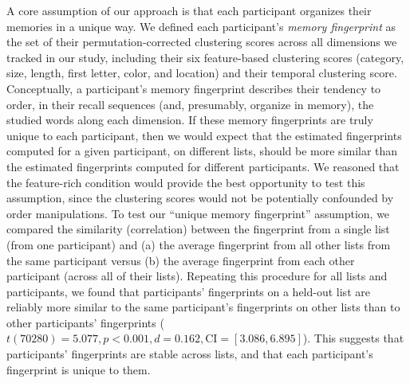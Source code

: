 \documentclass[11pt]{article}
\begin{document}
A core assumption of our approach is that each participant organizes their
memories in a unique way. We defined each participant's \textit{memory
fingerprint} as the set of their permutation-corrected clustering scores across
all dimensions we tracked in our study, including their six feature-based
clustering scores (category, size, length, first letter, color, and location)
and their temporal clustering score. Conceptually, a participant's memory
fingerprint describes their tendency to order, in their recall sequences (and,
presumably, organize in memory), the studied words along each dimension. If
these memory fingerprints are truly unique to each participant, then we would
expect that the estimated fingerprints computed for a given participant, on
different lists, should be more similar than the estimated fingerprints
computed for different participants. We reasoned that the feature-rich
condition would provide the best opportunity to test this assumption, since the
clustering scores would not be potentially confounded by order manipulations.
To test our ``unique memory fingerprint'' assumption, we compared the
similarity (correlation) between the fingerprint from a single list (from one
participant) and (a) the average fingerprint from all other lists from the same
participant versus (b) the average fingerprint from each other participant
(across all of their lists). Repeating this procedure for all lists and
participants, we found that participants' fingerprints on a held-out list are
reliably more similar to the same participant's fingerprints on other lists
than to other participants' fingerprints ($t(70280) = 5.077, p < 0.001, d =
0.162, \mathrm{CI} = [3.086, 6.895]$). This suggests that participants'
fingerprints are stable across lists, and that each participant's fingerprint
is unique to them.
\end{document}
